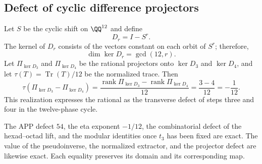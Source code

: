 \subsection{Defect of cyclic difference projectors}

Let \(S\) be the cyclic shift on \(\QQ^{12}\) and define
\[
 D_r=I-S^r.
\]
The kernel of \(D_r\) consists of the vectors constant on each orbit
of \(S^r\); therefore,
\[
 \dim\ker D_r=\gcd(12,r).
\]
Let \(\Pi_{\ker D_3}\) and \(\Pi_{\ker D_4}\) be the rational projectors onto
\(\ker D_3\) and \(\ker D_4\), and let
\(\tau(T)=\operatorname{Tr}(T)/12\) be the normalized trace. Then
\[
 \boxed{
 \tau(\Pi_{\ker D_3}-\Pi_{\ker D_4})
 =\frac{\operatorname{rank}\Pi_{\ker D_3}
       -\operatorname{rank}\Pi_{\ker D_4}}{12}
 =\frac{3-4}{12}
 =-\frac1{12}.}
\]
This realization expresses the rational as the transverse defect of steps
three and four in the twelve-phase cycle.

\begin{remark}
The APP defect \(54\), the eta exponent \(-1/12\), the combinatorial
defect of the hexad--octad lift, and the
modular identities once \(t_3\) has been fixed are exact. The value
of the pseudoinverse, the normalized extractor, and the projector defect are likewise exact.
Each equality preserves its domain and its corresponding map.
\end{remark}
